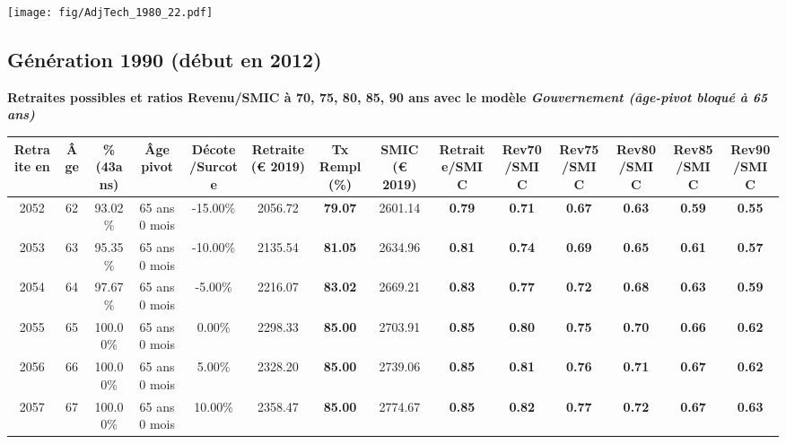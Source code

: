  \vspace{0.1cm} 

 \begin{center}\texttt{[image: fig/AdjTech\_1980\_22.pdf]}\end{center} \label{fig/AdjTech_1980_22.pdf} 

\newpage 
 
\subsection{Génération 1990 (début en 2012)} 

{\bf \noindent Retraites possibles et ratios Revenu/SMIC à 70, 75, 80, 85, 90 ans avec le modèle \emph{Gouvernement (âge-pivot bloqué à 65 ans)}}  
 
\begin{adjustbox}{max width=\textwidth} 
\begin{tabular}[htb]{|c|c||c|c|c||c|c||c||c|c|c|c|c|c|} 
\hline 
 Retraite en &  Âge &  \%(43ans) &  Âge pivot &  Décote/Surcote &  Retraite (\euro{} 2019) &  Tx Rempl(\%) &  SMIC (\euro{} 2019) &  Retraite/SMIC &  Rev70/SMIC &  Rev75/SMIC &  Rev80/SMIC &  Rev85/SMIC &  Rev90/SMIC \\ 
\hline \hline 
 2052 &  62 &  93.02\% &  65 ans 0 mois &  -15.00\% &  2056.72 &  {\bf 79.07} &  2601.14 &  {\bf {\color{red} 0.79}} &  {\bf {\color{red} 0.71}} &  {\bf {\color{red} 0.67}} &  {\bf {\color{red} 0.63}} &  {\bf {\color{red} 0.59}} &  {\bf {\color{red} 0.55}} \\ 
\hline 
 2053 &  63 &  95.35\% &  65 ans 0 mois &  -10.00\% &  2135.54 &  {\bf 81.05} &  2634.96 &  {\bf {\color{red} 0.81}} &  {\bf {\color{red} 0.74}} &  {\bf {\color{red} 0.69}} &  {\bf {\color{red} 0.65}} &  {\bf {\color{red} 0.61}} &  {\bf {\color{red} 0.57}} \\ 
\hline 
 2054 &  64 &  97.67\% &  65 ans 0 mois &  -5.00\% &  2216.07 &  {\bf 83.02} &  2669.21 &  {\bf {\color{red} 0.83}} &  {\bf {\color{red} 0.77}} &  {\bf {\color{red} 0.72}} &  {\bf {\color{red} 0.68}} &  {\bf {\color{red} 0.63}} &  {\bf {\color{red} 0.59}} \\ 
\hline 
 2055 &  65 &  100.00\% &  65 ans 0 mois &  0.00\% &  2298.33 &  {\bf 85.00} &  2703.91 &  {\bf {\color{red} 0.85}} &  {\bf {\color{red} 0.80}} &  {\bf {\color{red} 0.75}} &  {\bf {\color{red} 0.70}} &  {\bf {\color{red} 0.66}} &  {\bf {\color{red} 0.62}} \\ 
\hline 
 2056 &  66 &  100.00\% &  65 ans 0 mois &  5.00\% &  2328.20 &  {\bf 85.00} &  2739.06 &  {\bf {\color{red} 0.85}} &  {\bf {\color{red} 0.81}} &  {\bf {\color{red} 0.76}} &  {\bf {\color{red} 0.71}} &  {\bf {\color{red} 0.67}} &  {\bf {\color{red} 0.62}} \\ 
\hline 
 2057 &  67 &  100.00\% &  65 ans 0 mois &  10.00\% &  2358.47 &  {\bf 85.00} &  2774.67 &  {\bf {\color{red} 0.85}} &  {\bf {\color{red} 0.82}} &  {\bf {\color{red} 0.77}} &  {\bf {\color{red} 0.72}} &  {\bf {\color{red} 0.67}} &  {\bf {\color{red} 0.63}} \\ 
\hline 
\hline 
\end{tabular} 
\end{adjustbox} 
 
